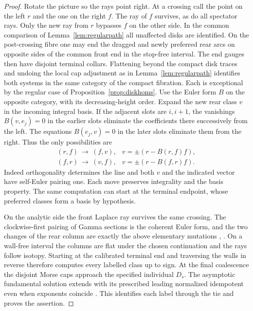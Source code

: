 \begin{proof}
Rotate the picture so the rays point right. At a crossing call the point on the left $r$ and the one on the right $f$. The ray of $f$ survives, as do all spectator rays. Only the new ray from $r$ bypasses $f$ on the other side. In the common comparison of Lemma~\ref{lem:regularpath} all unaffected disks are identified. On the post-crossing fibre one may end the dragged and newly preferred rear arcs on opposite sides of the common front end in the stop-free interval. The end gauges then have disjoint terminal collars. Flattening beyond the compact disk traces and undoing the local cap adjustment as in Lemma~\ref{lem:regularpath} identifies both systems in the same category of the compact fibration. Each is exceptional by the regular case of Proposition~\ref{prop:diskhoms}. Use the Euler form $B$ on the opposite category, with its decreasing-height order. Expand the new rear class $v$ in the incoming integral basis. If the adjacent slots are $i,i+1$, the vanishings $B(v,e_j)=0$ in the earlier slots eliminate the coefficients there successively from the left. The equations $B(e_j,v)=0$ in the later slots eliminate them from the right. Thus the only possibilities are
\[
\begin{array}{ll}
 (r,f)\ \longrightarrow\ (f,v),&v=\pm(r-B(r,f)f),\\
 (f,r)\ \longrightarrow\ (v,f),&v=\pm(r-B(f,r)f).
\end{array}
\]
Indeed orthogonality determines the line and both $v$ and the indicated vector have self-Euler pairing one. Each move preserves integrality and the basis property. The same computation can start at the terminal endpoint, whose preferred classes form a basis by hypothesis.

On the analytic side the front Laplace ray survives the same crossing. The clockwise-first pairing of Gamma sections is the coherent Euler form, and the two changes of the rear column are exactly the above elementary mutations \cite[\S\S2.5--2.6 and 4.3]{GGI}, \cite[Remark~4.13]{GI}. On a wall-free interval the columns are flat under the chosen continuation and the rays follow isotopy. Starting at the calibrated terminal end and traversing the walls in reverse therefore computes every labelled class up to sign. At the final coalescence the disjoint Morse caps approach the specified individual $D_s$. The asymptotic fundamental solution extends with its prescribed leading normalized idempotent even when exponents coincide \cite[Proposition~2.5.1]{GGI}. This identifies each label through the tie and proves the assertion.
\end{proof}
